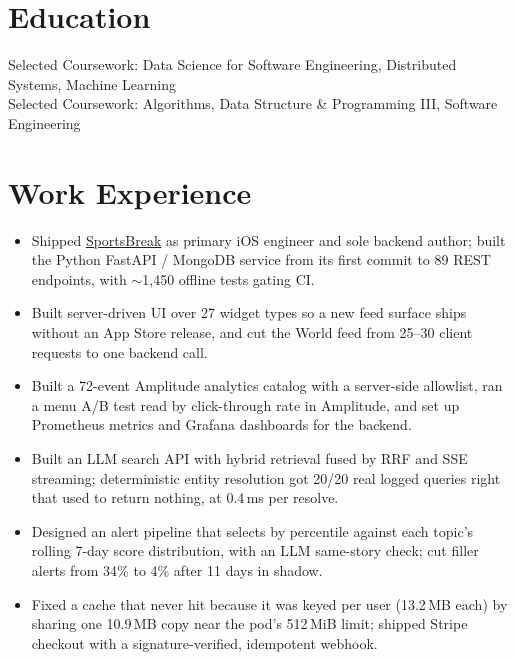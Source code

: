 \documentclass[11pt, letterpaper]{article}
\begin{document}

\section{Education}
Selected Coursework: Data Science for Software Engineering, Distributed Systems, Machine Learning\\[1pt]
Selected Coursework: Algorithms, Data Structure \& Programming III, Software Engineering

\section{Work Experience}
\begin{itemize}
  \item Shipped \href{https://apps.apple.com/app/id6762649287}{SportsBreak} as primary iOS engineer and sole backend author; built the Python FastAPI / MongoDB service from its first commit to 89 REST endpoints, with $\sim$1{,}450 offline tests gating CI.
  \item Built server-driven UI over 27 widget types so a new feed surface ships without an App Store release, and cut the World feed from 25--30 client requests to one backend call.
  \item Built a 72-event Amplitude analytics catalog with a server-side allowlist, ran a menu A/B test read by click-through rate in Amplitude, and set up Prometheus metrics and Grafana dashboards for the backend.
  \item Built an LLM search API with hybrid retrieval fused by RRF and SSE streaming; deterministic entity resolution got 20/20 real logged queries right that used to return nothing, at 0.4\,ms per resolve.
  \item Designed an alert pipeline that selects by percentile against each topic's rolling 7-day score distribution, with an LLM same-story check; cut filler alerts from 34\% to 4\% after 11 days in shadow.
  \item Fixed a cache that never hit because it was keyed per user (13.2\,MB each) by sharing one 10.9\,MB copy near the pod's 512\,MiB limit; shipped Stripe checkout with a signature-verified, idempotent webhook.
\end{itemize}
\end{document}
